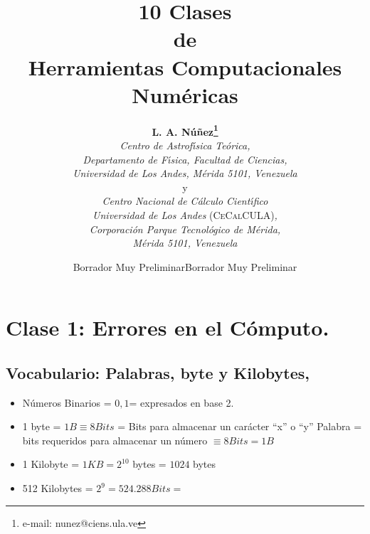 \documentclass[spanish,titlepage,11pt]{article}
\begin{document}
\title{\textbf{10 Clases }\\\textbf{de }\\\textbf{Herramientas Computacionales Num\'{e}ricas}}
\author{\textbf{L. A. N\'{u}\~{n}ez\thanks{ e-mail: nunez@ciens.ula.ve}}\\\textit{Centro de Astrof\'{\i}sica Te\'{o}rica,}\\\textit{Departamento de F\'{\i}sica, Facultad de Ciencias, }\\\textit{Universidad de Los Andes, M\'{e}rida 5101, Venezuela}\\y\\\textit{Centro Nacional de C\'{a}lculo Cient\'{\i}fico}\\\textit{Universidad de Los Andes }\textsc{(CeCalCULA)}\textit{,}\\\textit{Corporaci\'{o}n Parque Tecnol\'{o}gico de M\'{e}rida,}\\\textit{M\'{e}rida 5101, Venezuela}}
\date{Borrador Muy Preliminar}
\date{Borrador Muy Preliminar}
\maketitle
\tableofcontents



\newpage

\section{\textbf{Clase 1: Errores en el C\'{o}mputo.}}

\subsection{Vocabulario: Palabras, byte y Kilobytes,}

\begin{itemize}
\item  N\'{u}meros Binarios = $0,1$= expresados en base 2.

\item 1 byte = $1B\equiv8Bits$ = Bits para almacenar un car\'{a}cter ``x'' o
``y'' Palabra = bits requeridos para almacenar un n\'{u}mero $\equiv8Bits=1B$

\item 1 Kilobyte = $1KB=2^{10}$ bytes = $1024$ bytes

\item 512 Kilobytes = $2^{9}=524.288Bits=$
\end{itemize}
\end{document}
